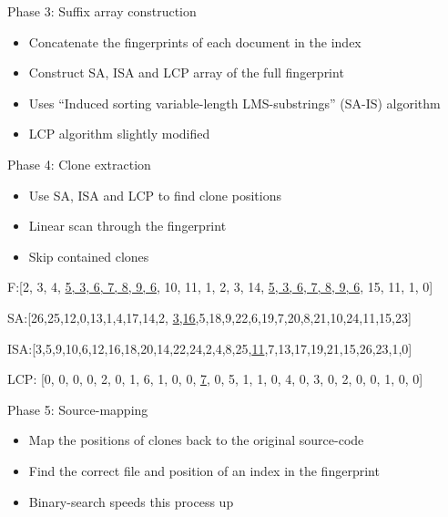 \documentclass[aspectratio=1610, xcolor=table]{beamer}
\begin{document}
\begin{frame}[fragile]{Phase 3: Suffix array construction}
    \begin{itemize}
        \item Concatenate the fingerprints of each document in the index
        \item Construct SA, ISA and LCP array of the full fingerprint
        \item Uses ``Induced sorting variable-length LMS-substrings'' (SA-IS) algorithm
        \item LCP algorithm slightly modified
    \end{itemize}

\end{frame}

\begin{frame}{Phase 4: Clone extraction}
    \begin{itemize}
        \item Use SA, ISA and LCP to find clone positions
        \item Linear scan through the fingerprint
        \item Skip contained clones
    \end{itemize}
    \begin{center}
        F:[2, 3, 4, {\color{blue}\underline{5, 3, 6, 7, 8, 9, 6,}} 10, 11, 1, 2, 3, 14,
        {\color{blue}\underline{5, 3, 6, 7, 8, 9, 6,}} 15, 11, 1, 0]

        SA:[26,25,12,0,13,1,4,17,14,2,{\color{blue} \underline{3,16}},5,18,9,22,6,19,7,20,8,21,10,24,11,15,23]

        ISA:[3,5,9,10,6,12,16,18,20,14,22,24,2,4,8,25,{\color{blue}\underline{11}},7,13,17,19,21,15,26,23,1,0]

        LCP: [0, 0, 0, 0, 2, 0, 1, 6, 1, 0, 0, {\color{blue} \underline{7}}, 0, 5, 1, 1, 0, 4, 0, 3, 0, 2, 0, 0, 1, 0, 0]
    \end{center}
\end{frame}

\begin{frame}{Phase 5: Source-mapping}
    \begin{itemize}
        \item Map the positions of clones back to the original source-code
        \item Find the correct file and position of an index in the fingerprint
        \item Binary-search speeds this process up
    \end{itemize}
\end{frame}
\end{document}
